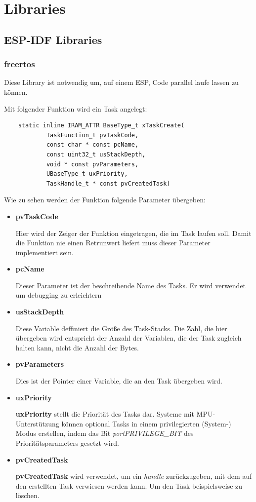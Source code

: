 \section{Libraries}\label{sec:libraries}

\subsection{ESP-IDF Libraries}\label{sec:esp-idf-libraries}

\subsubsection{freertos}\label{sec:esp-idf-libraries-freertos}
Diese Library ist notwendig um, auf einem ESP, Code parallel laufe lassen zu können.

Mit folgender Funktion wird ein Task angelegt:
\begin{verbatim}
    static inline IRAM_ATTR BaseType_t xTaskCreate(
            TaskFunction_t pvTaskCode,
            const char * const pcName,
            const uint32_t usStackDepth,
            void * const pvParameters,
            UBaseType_t uxPriority,
            TaskHandle_t * const pvCreatedTask)
\end{verbatim}

Wie zu sehen werden der Funktion folgende Parameter übergeben:
\begin{itemize}
    \item \textbf{pvTaskCode}

    Hier wird der Zeiger der Funktion eingetragen, die im Task laufen soll. Damit die Funktion nie einen Retrunwert liefert muss dieser Parameter implementiert sein.
    \item \textbf{pcName}
    
    Dieser Parameter ist der beschreibende Name des Tasks. Er wird verwendet um debugging zu erleichtern

    \item \textbf{usStackDepth}
    
    Diese Variable deffiniert die Größe des Task-Stacks. Die Zahl, die hier übergeben wird entspricht der Anzahl der Variablen, die der Task zugleich halten kann, nicht die Anzahl der Bytes.
    \item \textbf{pvParameters}
    
    Dies ist der Pointer einer Variable, die an den Task übergeben wird.
    \item  \textbf{uxPriority}
    
    \textbf{uxPriority} stellt die Priorität des Tasks dar. Systeme mit MPU-Unterstützung können optional Tasks in einem privilegierten (System-) Modus erstellen, indem das Bit \textit{portPRIVILEGE\_BIT} des Prioritätsparameters gesetzt wird.
    \item \textbf{pvCreatedTask}
    
    \textbf{pvCreatedTask} wird verwendet, um ein \textit{handle} zurückzugeben, mit dem auf den erstellten Task verwiesen werden kann. Um den Task beispielsweise zu löschen.
\end{itemize}
\cite{xTaskCreate_definition}

